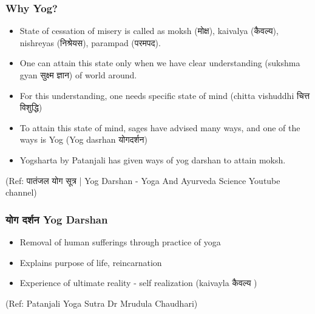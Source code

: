 \begin{frame}[fragile]\frametitle{Why Yog?}

	\begin{itemize}
	\item State of cessation of misery is called as moksh (मोक्ष), kaivalya (कैवल्य), nishreyas (निश्रेयस), parampad (परमपद).
	\item One can attain this state only when we have clear understanding (sukshma gyan सुक्ष्म ज्ञान) of world around.
	\item For this understanding, one needs specific state of mind (chitta vishuddhi चित्त विशुद्धि)
	\item To attain this state of mind, sages have advised many ways, and one of the ways is Yog (Yog dasrhan योगदर्शन)
	\item Yogsharta by Patanjali has given ways of yog darshan to attain moksh.
	\end{itemize}

\tiny{(Ref: पातंजल योग सूत्र | Yog Darshan - Yoga And Ayurveda Science Youtube channel)}

\end{frame}

\begin{frame}[fragile]\frametitle{ योग दर्शन Yog Darshan}

	\begin{itemize}
	\item Removal of human sufferings through practice of yoga
	\item Explains purpose of life, reincarnation
	\item Experience of ultimate reality - self realization (kaivayla कैवल्य )
	\end{itemize}

\tiny{(Ref: Patanjali Yoga Sutra Dr Mrudula Chaudhari)}

\end{frame}



